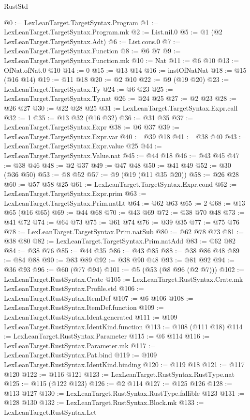 \begin{lexlean}{RustStd}
\begin{coremodule}
@0 := LexLeanTarget.TargetSyntax.Program
@1 := LexLeanTarget.TargetSyntax.Program.mk
@2 := List.nil.{0}
@5 := @1 (@2 LexLeanTarget.TargetSyntax.Adt)
@6 := List.cons.{0}
@7 := LexLeanTarget.TargetSyntax.Function
@8 := @6 @7
@9 := LexLeanTarget.TargetSyntax.Function.mk
@10 := Nat
@11 := @6 @10
@13 := OfNat.ofNat.{0} @10
@14 := 0
@15 := @13 @14
@16 := instOfNatNat
@18 := @15 (@16 @14)
@19 := @11 @18
@20 := @2 @10
@22 := @9 (@19 @20)
@23 := LexLeanTarget.TargetSyntax.Ty
@24 := @6 @23
@25 := LexLeanTarget.TargetSyntax.Ty.nat
@26 := @24 @25
@27 := @2 @23
@28 := @26 @27
@30 := @22 @28 @25
@31 := LexLeanTarget.TargetSyntax.Expr.call
@32 := 1
@35 := @13 @32 (@16 @32)
@36 := @31 @35
@37 := LexLeanTarget.TargetSyntax.Expr
@38 := @6 @37
@39 := LexLeanTarget.TargetSyntax.Expr.var
@40 := @39 @18
@41 := @38 @40
@43 := LexLeanTarget.TargetSyntax.Expr.value @25
@44 := LexLeanTarget.TargetSyntax.Value.nat
@45 := @44 @18
@46 := @43 @45
@47 := @38 @46
@48 := @2 @37
@49 := @47 @48
@50 := @41 @49
@52 := @30 (@36 @50)
@53 := @8 @52
@57 := @9 (@19 (@11 @35 @20))
@58 := @26 @28
@60 := @57 @58 @25
@61 := LexLeanTarget.TargetSyntax.Expr.cond
@62 := LexLeanTarget.TargetSyntax.Expr.prim
@63 := LexLeanTarget.TargetSyntax.Prim.natLt
@64 := @62 @63
@65 := 2
@68 := @13 @65 (@16 @65)
@69 := @44 @68
@70 := @43 @69
@72 := @38 @70 @48
@73 := @41 @72
@74 := @64 @73
@75 := @61 @74
@76 := @39 @35
@77 := @75 @76
@78 := LexLeanTarget.TargetSyntax.Prim.natSub
@80 := @62 @78 @73
@81 := @38 @80
@82 := LexLeanTarget.TargetSyntax.Prim.natAdd
@83 := @62 @82
@84 := @38 @76
@85 := @44 @35
@86 := @43 @85
@88 := @38 @86 @48
@89 := @84 @88
@90 := @83 @89
@92 := @38 @90 @48
@93 := @81 @92
@94 := @36 @93
@96 := @60 (@77 @94)
@101 := @5 (@53 (@8 @96 (@2 @7)))
@102 := LexLeanTarget.RustSyntax.Crate
@105 := LexLeanTarget.RustSyntax.Crate.mk LexLeanTarget.RustSyntax.Profile.std
@106 := LexLeanTarget.RustSyntax.ItemDef
@107 := @6 @106
@108 := LexLeanTarget.RustSyntax.ItemDef.function
@109 := LexLeanTarget.RustSyntax.Ident.generated
@111 := @109 LexLeanTarget.RustSyntax.IdentKind.function
@113 := @108 (@111 @18)
@114 := LexLeanTarget.RustSyntax.Parameter
@115 := @6 @114
@116 := LexLeanTarget.RustSyntax.Parameter.mk
@117 := LexLeanTarget.RustSyntax.Pat.bind
@119 := @109 LexLeanTarget.RustSyntax.IdentKind.binding
@120 := @119 @18
@121 := @117 @120
@122 := @116 @121
@123 := LexLeanTarget.RustSyntax.RustType.nat
@125 := @115 (@122 @123)
@126 := @2 @114
@127 := @125 @126
@128 := @113 @127
@130 := LexLeanTarget.RustSyntax.RustType.fallible @123
@131 := @128 @130
@132 := LexLeanTarget.RustSyntax.Block.mk
@133 := LexLeanTarget.RustSyntax.Let

\end{coremodule}
\end{lexlean}
